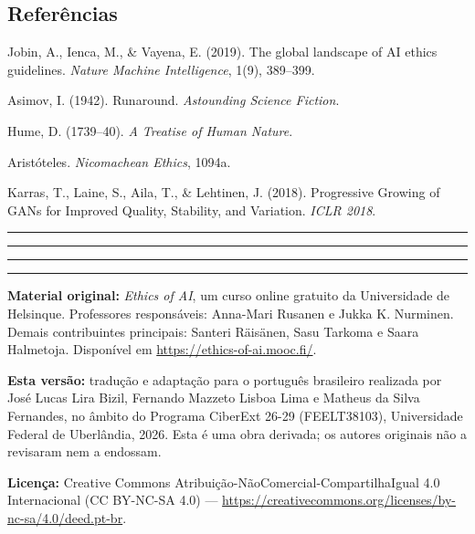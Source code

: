 \documentclass[
  11pt,
]{article}
\newcommand{\faixaEixos}[1][\linewidth]{%
  \noindent
  \textcolor{iaConceitos}{\rule{0.3333#1}{4pt}}%
  \textcolor{iaAplic}{\rule{0.3333#1}{4pt}}%
  \textcolor{iaRiscos}{\rule{0.3333#1}{4pt}}%
  \par}
\newenvironment{licenca}
  {\par\vspace{2em}\faixaEixos\par\vspace{0.8em}
   \begingroup\sffamily\scriptsize\color{iaTintaFraca}}
  {\endgroup\par}
\begin{document}
\subsection{Referências}\label{referuxeancias}

Jobin, A., Ienca, M., \& Vayena, E. (2019). The global landscape of AI
ethics guidelines. \emph{Nature Machine Intelligence}, 1(9), 389--399.

Asimov, I. (1942). Runaround. \emph{Astounding Science Fiction}.

Hume, D. (1739--40). \emph{A Treatise of Human Nature}.

Aristóteles. \emph{Nicomachean Ethics}, 1094a.

Karras, T., Laine, S., Aila, T., \& Lehtinen, J. (2018). Progressive
Growing of GANs for Improved Quality, Stability, and Variation.
\emph{ICLR 2018}.

\begin{center}\rule{0.5\linewidth}{0.5pt}\end{center}

\begin{licenca}

\textbf{Material original:} \emph{Ethics of AI}, um curso online
gratuito da Universidade de Helsinque. Professores responsáveis:
Anna-Mari Rusanen e Jukka K. Nurminen. Demais contribuintes principais:
Santeri Räisänen, Sasu Tarkoma e Saara Halmetoja. Disponível em
\url{https://ethics-of-ai.mooc.fi/}.

\textbf{Esta versão:} tradução e adaptação para o português brasileiro
realizada por José Lucas Lira Bizil, Fernando Mazzeto Lisboa Lima e
Matheus da Silva Fernandes, no âmbito do Programa CiberExt 26-29
(FEELT38103), Universidade Federal de Uberlândia, 2026. Esta é uma obra
derivada; os autores originais não a revisaram nem a endossam.

\textbf{Licença:} Creative Commons
Atribuição-NãoComercial-CompartilhaIgual 4.0 Internacional (CC BY-NC-SA
4.0) ---
\url{https://creativecommons.org/licenses/by-nc-sa/4.0/deed.pt-br}.

\end{licenca}
\end{document}
